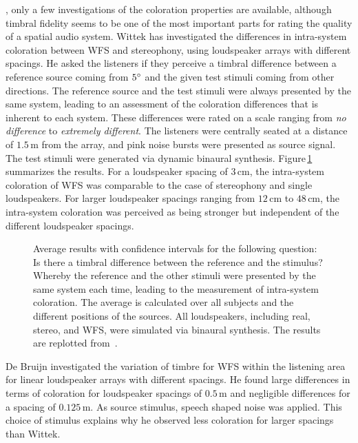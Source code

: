 , only a few investigations of the coloration properties
are available, although timbral fidelity seems to be one of the most important
parts for rating the quality of a spatial audio system.\autocite{Rumsey2005}
Wittek\autocite{Wittek2007} has investigated the differences in intra-system
coloration between \ac{WFS} and stereophony, using loudspeaker arrays with different spacings.
He asked the listeners if they perceive a timbral
difference between a reference source coming from $5^\circ$ and the given test
stimuli coming from other directions. The reference source and the test stimuli
were always presented by the same system, leading to an assessment of the
coloration differences that is inherent to each system. These
differences were rated on a scale ranging from \emph{no difference}
to \emph{extremely different}.
The listeners were centrally seated at a distance of
$1.5$\,m from the array, and pink noise bursts were presented as source signal.
The test stimuli were generated via dynamic binaural synthesis.
Figure\,\ref{fig:wfs_coloration_wittek} summarizes the results.
For a loudspeaker spacing of $3$\,cm, the intra-system coloration of \ac{WFS}
was comparable to the case of stereophony and single loudspeakers. For
larger loudspeaker spacings ranging from $12$\,cm to $48$\,cm, the intra-system
coloration was perceived as being stronger but independent of the different
loudspeaker spacings.
%
\begin{figure}[t]
    \small
    \centering
    
    \caption{Average results with confidence intervals for the following question:
    Is there a timbral difference between the reference and the stimulus?
    Whereby the reference and the other stimuli were presented by the same
    system each time, leading to the measurement of intra-system coloration.
    The average is calculated over all subjects and the different positions of the
    sources. All loudspeakers, including real, stereo, and WFS, were simulated
    via binaural synthesis. The results are replotted
    from~\cite[][Fig.\,8.6]{Wittek2007}.
    }
    \label{fig:wfs_coloration_wittek}
\end{figure}

De Bruijn\autocite{DeBrujin2004} investigated the variation of
timbre for \ac{WFS} within the listening area for linear loudspeaker arrays
with different spacings.
He found large differences in terms of coloration for loudspeaker spacings of $0.5$\,m
and negligible differences for a spacing of $0.125$\,m. As source stimulus, speech shaped
noise was applied. This choice of stimulus explains why he observed less
coloration for larger spacings than Wittek.

